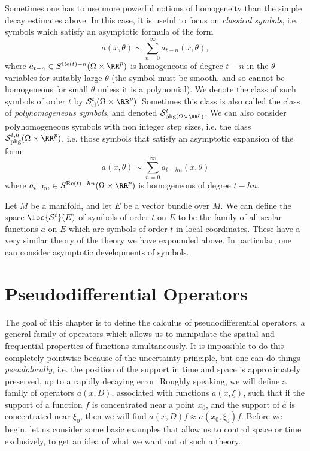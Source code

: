 Sometimes one has to use more powerful notions of homogeneity than the simple decay estimates above. In this case, it is useful to focus on \emph{classical symbols}, i.e. symbols which satisfy an asymptotic formula of the form
%
\[ a(x,\theta) \sim \sum_{n = 0}^\infty a_{t-n}(x,\theta), \]
%
where $a_{t-n} \in S^{\text{Re}(t) - n}(\Omega \times \RR^p)$ is homogeneous of degree $t-n$ in the $\theta$ variables for suitably large $\theta$ (the symbol must be smooth, and so cannot be homogeneous for small $\theta$ unless it is a polynomial). We denote the class of such symbols of order $t$ by $\mathcal{S}^t_{\text{cl}}(\Omega \times \RR^p)$. Sometimes this class is also called the class of \emph{polyhomogeneous symbols}, and denoted $\mathcal{S}^t_{\text{phg}(\Omega \times \RR^p)}$. We can also consider polyhomogeneous symbols with non integer step sizes, i.e. the class $\mathcal{S}^{t,h}_{\text{phg}}(\Omega \times \RR^p)$, i.e. those symbols that satisfy an asymptotic expansion of the form
%
\[ a(x,\theta) \sim \sum_{n = 0}^\infty a_{t - hn}(x,\theta) \]
%
where $a_{t-hn} \in S^{\text{Re}(t) - hn}(\Omega \times \RR^p)$ is homogeneous of degree $t-hn$.

\begin{remark}
    Let $M$ be a manifold, and let $E$ be a vector bundle over $M$. We can define the space $\loc{\mathcal{S}^t}(E)$ of symbols of order $t$ on $E$ to be the family of all scalar functions $a$ on $E$ which are symbols of order $t$ in local coordinates. These have a very similar theory of the theory we have expounded above. In particular, one can consider asymptotic developments of symbols.
\end{remark}












\chapter{Pseudodifferential Operators}

The goal of this chapter is to define the calculus of pseudodifferential operators, a general family of operators which allows us to manipulate the spatial and frequential properties of functions simultaneously. It is impossible to do this completely pointwise because of the uncertainty principle, but one can do things \emph{pseudolocally}, i.e. the position of the support in time and space is approximately preserved, up to a rapidly decaying error. Roughly speaking, we will define a family of operators $a(x,D)$, associated with functions $a(x,\xi)$, such that if the support of a function $f$ is concentrated near a point $x_0$, and the support of $\widehat{a}$ is concentrated near $\xi_0$, then we will find $a(x,D) f \approx a(x_0,\xi_0) f$. Before we begin, let us consider some basic examples that allow us to control space or time exclusively, to get an idea of what we want out of such a theory.

